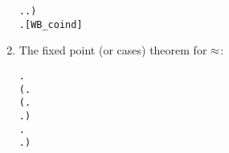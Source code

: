 \begin{enumerate}
\begin{small}
\begin{alltt}
            \HOLSymConst{\HOLTokenForall{}}.  \HOLTokenTransBegin\HOLSymConst{\ensuremath{\tau}}\HOLTokenTransEnd {} \HOLSymConst{\HOLTokenImp{}} \HOLSymConst{\HOLTokenExists{}}.  \HOLSymConst{\HOLTokenEPS}  \HOLSymConst{\HOLTokenConj{}}   ) \HOLSymConst{\HOLTokenImp{}}
       \HOLSymConst{\HOLTokenForall{}} .    \HOLSymConst{\HOLTokenImp{}}  \HOLSymConst{\HOLTokenWeakEQ} \hfill{[WB_coind]}
\end{alltt}
\end{small}
\item The fixed point (or cases) theorem for $\approx$:
\begin{small}
\begin{alltt}
\HOLTokenTurnstile{} \HOLSymConst{\HOLTokenForall{}} .
        \HOLSymConst{\HOLTokenWeakEQ}  \HOLSymConst{\HOLTokenEquiv{}}
       (\HOLSymConst{\HOLTokenForall{}}.
            (\HOLSymConst{\HOLTokenForall{}}.
                  \HOLTokenTransBegin{} \HOLTokenTransEnd {} \HOLSymConst{\HOLTokenImp{}}
                 \HOLSymConst{\HOLTokenExists{}}.  \HOLTokenWeakTransBegin{} \HOLTokenWeakTransEnd {} \HOLSymConst{\HOLTokenConj{}}  \HOLSymConst{\HOLTokenWeakEQ} ) \HOLSymConst{\HOLTokenConj{}}
            \HOLSymConst{\HOLTokenForall{}}.
                 \HOLTokenTransBegin{} \HOLTokenTransEnd {} \HOLSymConst{\HOLTokenImp{}}
                \HOLSymConst{\HOLTokenExists{}}.  \HOLTokenWeakTransBegin{} \HOLTokenWeakTransEnd {} \HOLSymConst{\HOLTokenConj{}}  \HOLSymConst{\HOLTokenWeakEQ} ) \HOLSymConst{\HOLTokenConj{}}

\end{alltt}
\end{small}
\end{enumerate}
